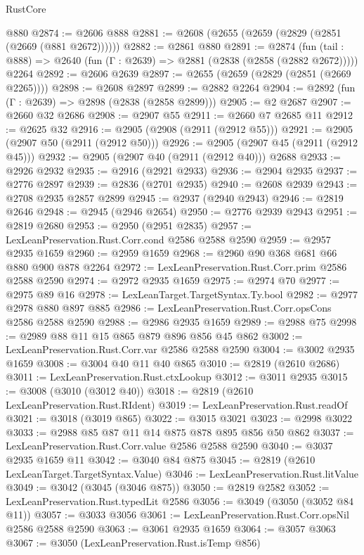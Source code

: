 \begin{lexlean}{RustCore}
\begin{coremodule}
    @880
@2874 := @2606 @888
@2881 := @2608 (@2655 (@2659 (@2829 (@2851 (@2669 (@881 @2672))))))
@2882 := @2861 @880
@2891 := @2874
    (fun (tail : @888) => @2640 (fun (Γ : @2639) => @2881 (@2838 (@2858 (@2882 @2672)))))
    @2264
@2892 := @2606 @2639
@2897 := @2655 (@2659 (@2829 (@2851 (@2669 @2265))))
@2898 := @2608 @2897
@2899 := @2882 @2264
@2904 := @2892 (fun (Γ : @2639) => @2898 (@2838 (@2858 @2899)))
@2905 := @2 @2687
@2907 := @2660 @32 @2686
@2908 := @2907 @55
@2911 := @2660 @7 @2685 @11
@2912 := @2625 @32
@2916 := @2905 (@2908 (@2911 (@2912 @55)))
@2921 := @2905 (@2907 @50 (@2911 (@2912 @50)))
@2926 := @2905 (@2907 @45 (@2911 (@2912 @45)))
@2932 := @2905 (@2907 @40 (@2911 (@2912 @40))) @2688
@2933 := @2926 @2932
@2935 := @2916 (@2921 @2933)
@2936 := @2904 @2935
@2937 := @2776 @2897
@2939 := @2836 (@2701 @2935)
@2940 := @2608 @2939
@2943 := @2708 @2935 @2857 @2899
@2945 := @2937 (@2940 @2943)
@2946 := @2819 @2646
@2948 := @2945 (@2946 @2654)
@2950 := @2776 @2939 @2943
@2951 := @2819 @2680
@2953 := @2950 (@2951 @2835)
@2957 := LexLeanPreservation.Rust.Corr.cond @2586 @2588 @2590
@2959 := @2957 @2935 @1659
@2960 := @2959 @1659
@2968 := @2960 @90 @368 @681 @66 @880 @900 @878 @2264
@2972 := LexLeanPreservation.Rust.Corr.prim @2586 @2588 @2590
@2974 := @2972 @2935 @1659
@2975 := @2974 @70
@2977 := @2975 @89 @16
@2978 := LexLeanTarget.TargetSyntax.Ty.bool
@2982 := @2977 @2978 @880 @897 @885
@2986 := LexLeanPreservation.Rust.Corr.opsCons @2586 @2588 @2590
@2988 := @2986 @2935 @1659
@2989 := @2988 @75
@2998 := @2989 @88 @11 @15 @865 @879 @896 @856 @45 @862
@3002 := LexLeanPreservation.Rust.Corr.var @2586 @2588 @2590
@3004 := @3002 @2935 @1659
@3008 := @3004 @40 @11 @40 @865
@3010 := @2819 (@2610 @2686)
@3011 := LexLeanPreservation.Rust.ctxLookup
@3012 := @3011 @2935
@3015 := @3008 (@3010 (@3012 @40))
@3018 := @2819 (@2610 LexLeanPreservation.Rust.RIdent)
@3019 := LexLeanPreservation.Rust.readOf
@3021 := @3018 (@3019 @865)
@3022 := @3015 @3021
@3023 := @2998 @3022
@3033 := @2988 @85 @87 @11 @14 @875 @878 @895 @856 @50 @862
@3037 := LexLeanPreservation.Rust.Corr.value @2586 @2588 @2590
@3040 := @3037 @2935 @1659 @11
@3042 := @3040 @84 @875
@3045 := @2819 (@2610 LexLeanTarget.TargetSyntax.Value)
@3046 := LexLeanPreservation.Rust.litValue
@3049 := @3042 (@3045 (@3046 @875))
@3050 := @2819 @2582
@3052 := LexLeanPreservation.Rust.typedLit @2586
@3056 := @3049 (@3050 (@3052 @84 @11))
@3057 := @3033 @3056
@3061 := LexLeanPreservation.Rust.Corr.opsNil @2586 @2588 @2590
@3063 := @3061 @2935 @1659
@3064 := @3057 @3063
@3067 := @3050 (LexLeanPreservation.Rust.isTemp @856)

\end{coremodule}
\end{lexlean}
